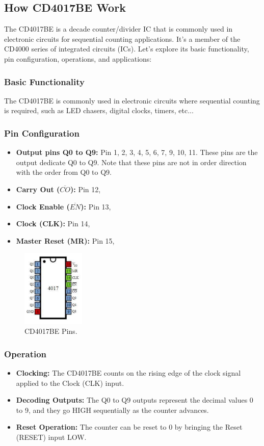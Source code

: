\documentclass{article}
\begin{document}
\subsection{How CD4017BE Work}
The CD4017BE is a decade counter/divider IC that is commonly used in electronic circuits for sequential counting applications. It's a member of the CD4000 series of integrated circuits (ICs). Let's explore its basic functionality, pin configuration, operations, and applications:

\subsubsection{Basic Functionality}
The CD4017BE is commonly used in electronic circuits where sequential counting is required, such as LED chasers, digital clocks, timers, etc...

\subsubsection{Pin Configuration}
\begin{itemize}
    \item \textbf{Output pins Q0 to Q9:} Pin 1, 2, 3, 4, 5, 6, 7, 9, 10, 11. These pins are the output dedicate Q0 to Q9. Note that these pins are not in order direction with the order from Q0 to Q9.
    \item \textbf{Carry Out ($\overline{CO}$): }Pin 12, 
    \item \textbf{Clock Enable ($\overline{EN}$): }Pin 13,
    \item \textbf{Clock (CLK): }Pin 14,
    \item \textbf{Master Reset (MR): }Pin 15,
\end{itemize}

\begin{figure}[h]
    \centering
    \includegraphics[width=3cm]{Pic/Pictures/4017 pins.png}
    \caption{CD4017BE Pins.}
    \label{fig:enter-label}
\end{figure}

\subsubsection{Operation}
\begin{itemize}
    \item \textbf{Clocking:} The CD4017BE counts on the rising edge of the clock signal applied to the Clock (CLK) input.
    \item \textbf{Decoding Outputs:} The Q0 to Q9 outputs represent the decimal values 0 to 9, and they go HIGH sequentially as the counter advances.
    \item \textbf{Reset Operation:} The counter can be reset to 0 by bringing the Reset (RESET) input LOW.
\end{itemize}
\end{document}

